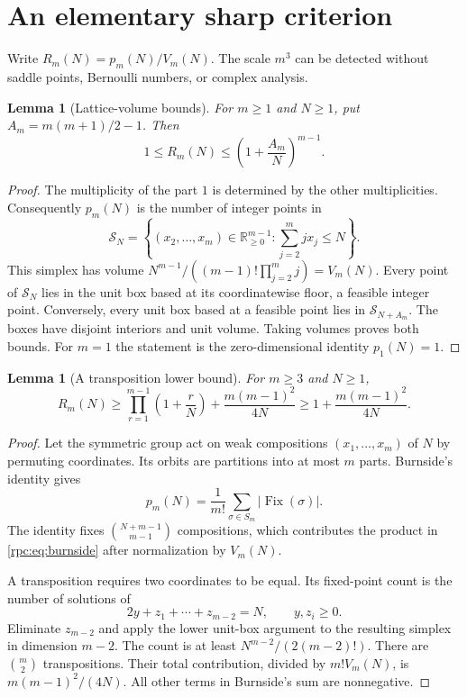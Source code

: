 \documentclass[11pt]{article}
\newtheorem{lemma}[theorem]{Lemma}
\theoremstyle{definition}
\theoremstyle{remark}
\DeclareMathOperator{\Fix}{Fix}
\numberwithin{equation}{section}
\begin{document}
\section{An elementary sharp criterion}\label{rpc:sec:elementary}

Write $R_m(N)=p_m(N)/V_m(N)$. The scale $m^3$ can be detected without
saddle points, Bernoulli numbers, or complex analysis.

\begin{lemma}[Lattice-volume bounds]\label{rpc:lem:volume}
For $m\ge1$ and $N\ge1$, put $A_m=m(m+1)/2-1$. Then
\begin{equation}\label{rpc:eq:volume}
 1\le R_m(N)\le\left(1+\frac{A_m}{N}\right)^{m-1}.
\end{equation}
\end{lemma}
\begin{proof}
The multiplicity of the part $1$ is determined by the other multiplicities.
Consequently $p_m(N)$ is the number of integer points in
\[
 \mathcal S_N=\left\{(x_2,\ldots,x_m)\in\mathbb R_{\ge0}^{m-1}:
                         \sum_{j=2}^m jx_j\le N\right\}.
\]
This simplex has volume $N^{m-1}/((m-1)!\prod_{j=2}^m j)=V_m(N)$.
Every point of $\mathcal S_N$ lies in the unit box based at its coordinatewise
floor, a feasible integer point. Conversely, every unit box based at a feasible
point lies in $\mathcal S_{N+A_m}$. The boxes have disjoint interiors and unit
volume. Taking volumes proves both bounds. For $m=1$ the statement is the
zero-dimensional identity $p_1(N)=1$.
\end{proof}

\begin{lemma}[A transposition lower bound]\label{rpc:lem:burnside}
For $m\ge3$ and $N\ge1$,
\begin{equation}\label{rpc:eq:burnside}
 R_m(N)\ge
 \prod_{r=1}^{m-1}\left(1+\frac rN\right)
 +\frac{m(m-1)^2}{4N}
 \ge 1+\frac{m(m-1)^2}{4N}.
\end{equation}
\end{lemma}
\begin{proof}
Let the symmetric group act on weak compositions
$(x_1,\ldots,x_m)$ of $N$ by permuting coordinates. Its orbits are partitions
into at most $m$ parts. Burnside's identity gives
\[
 p_m(N)=\frac1{m!}\sum_{\sigma\in S_m}|\Fix(\sigma)|.
\]
The identity fixes $\binom{N+m-1}{m-1}$ compositions, which contributes the
product in \eqref{rpc:eq:burnside} after normalization by $V_m(N)$.

A transposition requires two coordinates to be equal. Its fixed-point count
is the number of solutions of
\[
 2y+z_1+\cdots+z_{m-2}=N,\qquad y,z_i\ge0.
\]
Eliminate $z_{m-2}$ and apply the lower unit-box argument to the resulting
simplex in dimension $m-2$. The count is at least
$N^{m-2}/(2(m-2)!)$. There are $\binom m2$ transpositions. Their total
contribution, divided by $m!V_m(N)$, is $m(m-1)^2/(4N)$. All other terms
in Burnside's sum are nonnegative.
\end{proof}
\end{document}
